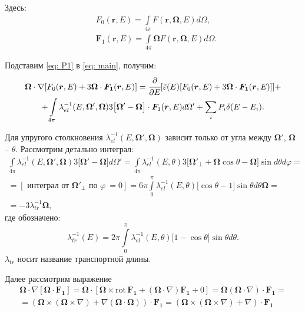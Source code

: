 \documentclass[a4paper,12pt]{article} %
\newcommand{\df}[1]{\cfrac{\partial}{\partial #1}}
\renewcommand{\vec}[1]{\bm{#1}}
\newcommand{\rot}{\mathrm{rot}\,}
\newcommand{\eps}{\varepsilon}
\renewcommand{\phi}{\varphi}
\begin{document}
Здесь:
\begin{align}
	& F_0(\vec{r}, E) = \int\limits_{4\pi} F(\vec{r}, \vec{\Omega}, E) d\Omega, \\
	& \vec{F}_1(\vec{r}, E) = \int\limits_{4\pi} \vec{\Omega} F(\vec{r}, \vec{\Omega}, E) d\Omega.
\end{align}

Подставим \eqref{eq: P1} в \eqref{eq: main}, получим:
\begin{equation}\label{eq: P1is}
\begin{gathered}
	\vec{\Omega}\cdot\nabla [ F_0(\vec{r}, E) + 3 \vec{\Omega}\cdot\vec{F_1}(\vec{r}, E) ] = 
	\df{E}[\bar{\eps}(E)[ F_0(\vec{r}, E) + 3 \vec{\Omega}\cdot\vec{F_1}(\vec{r}, E) ]] + \\ +
	\int\limits_{4\pi} \lambda^{-1}_{el}(E, \vec{\Omega}', \vec{\Omega}) 3 \big[ \vec{\Omega}' - \vec{\Omega}\big] \cdot \vec{F}_1 (\vec{r}, E) d\Omega' +
	\sum_{i} P_i\delta(E - E_i).
\end{gathered}
\end{equation}

Для упругого столкновения $\lambda^{-1}_{el}(E, \vec{\Omega}', \vec{\Omega})$ зависит только от угла между $\vec{\Omega}'$, $\vec{\Omega}$ -- $\theta$. Рассмотрим детально интеграл:
\begin{equation}
\begin{gathered}
	\int\limits_{4\pi} \lambda^{-1}_{el}(E, \vec{\Omega}', \vec{\Omega}) 3 \big[ \vec{\Omega}' - \vec{\Omega}\big] d\Omega' = 
	\int\limits_{4\pi} \lambda^{-1}_{el}(E, \theta) 3 \big[ \vec{\Omega}'_{\perp} + \vec{\Omega} \cos \theta - \vec{\Omega}\big] \sin d\theta d\phi = \\ 
	= [\text{ интеграл от } \vec{\Omega}'_{\perp} \text{ по } \phi ~ = 0] = 
	6\pi\int\limits_{0}^\pi \lambda^{-1}_{el}(E, \theta) \big[ \cos \theta - 1\big] \sin \theta d\theta \vec{\Omega} = \\ =
	- 3 \lambda^{-1}_{tr} \vec{\Omega},
\end{gathered}
\end{equation}
где обозначено:
\begin{equation}
	\lambda^{-1}_{tr}(E) = 2\pi\int\limits_{0}^\pi \lambda^{-1}_{el}(E, \theta) \big[ 1 -\cos \theta \big] \sin \theta d\theta.
\end{equation}
$\lambda_{tr}$ носит название транспортной длины.

Далее рассмотрим выражение
\begin{equation}
\begin{gathered}
	\vec{\Omega}\cdot\nabla [\vec{\Omega}\cdot\vec{F_1}] = 
	\vec{\Omega}\cdot[
	\vec{\Omega} \times \rot \vec{F_1} +
	(\vec{\Omega}\cdot\nabla) \vec{F_1} + 0
	] = \vec{\Omega}(\vec{\Omega}\cdot\nabla)\cdot \vec{F_1} = \\ 
	= (\vec{\Omega}\times(\vec{\Omega}\times\nabla) + \nabla (\vec{\Omega}\cdot\vec{\Omega}))\cdot\vec{F_1} =
	(\vec{\Omega}\times(\vec{\Omega}\times\nabla) + \nabla)\cdot\vec{F_1}   
\end{gathered}
\end{equation}
\end{document}
